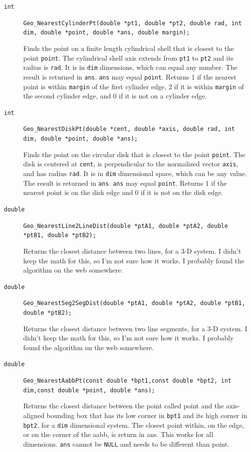 \documentclass[11pt]{article}
\newcommand {\ttt} {\texttt}
\begin{document}
\begin{description}
\item[\ttt{int}]
\ttt{Geo\_NearestCylinderPt(double *pt1, double *pt2, double rad, int dim, double *point, double *ans, double margin);}

Finds the point on a finite length cylindrical shell that is closest to the point \ttt{point}. The cylindrical shell axis extends from \ttt{pt1} to \ttt{pt2} and its radius is \ttt{rad}. It is in \ttt{dim} dimensions, which can equal any number. The result is returned in \ttt{ans}. \ttt{ans} may equal \ttt{point}. Returns 1 if the nearest point is within \ttt{margin} of the first cylinder edge, 2 if it is within \ttt{margin} of the second cylinder edge, and 0 if it is not on a cylinder edge.

\item[\ttt{int}]
\ttt{Geo\_NearestDiskPt(double *cent, double *axis, double rad, int dim, double *point, double *ans);}

Finds the point on the circular disk that is closest to the point \ttt{point}. The disk is centered at \ttt{cent}, is perpendicular to the normalized vector \ttt{axis}, and has radius \ttt{rad}. It is in \ttt{dim} dimensional space, which can be any value. The result is returned in \ttt{ans}. \ttt{ans} may equal \ttt{point}. Returns 1 if the nearest point is on the disk edge and 0 if it is not on the disk edge.

\item[\ttt{double}]
\ttt{Geo\_NearestLine2LineDist(double *ptA1, double *ptA2, double *ptB1, double *ptB2);}

Returns the closest distance between two lines, for a 3-D system. I didn't keep the math for this, so I'm not sure how it works. I probably found the algorithm on the web somewhere.

\item[\ttt{double}]
\ttt{Geo\_NearestSeg2SegDist(double *ptA1, double *ptA2, double *ptB1, double *ptB2);}

Returns the closest distance between two line segments, for a 3-D system. I didn't keep the math for this, so I'm not sure how it works. I probably found the algorithm on the web somewhere.

\item[\ttt{double}]
\ttt{Geo\_NearestAabbPt(const double *bpt1,const double *bpt2, int dim,const double *point, double *ans);}

Returns the closest distance between the point called point and the axis-aligned bounding box that has its low corner in \ttt{bpt1} and its high corner in \ttt{bpt2}, for a \ttt{dim} dimensional system. The closest point within, on the edge, or on the corner of the aabb, is return in ans. This works for all dimensions. \ttt{ans} cannot be \ttt{NULL} and needs to be different than point.


\end{description}
\end{document}
